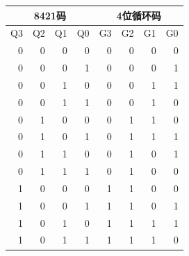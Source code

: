 \documentclass[11pt,UTF8]{ctexart}
\def\toprule{\hline}
\def\midrule{\hline}
\begin{document}
\begin{table}[htbp]
  \centering
    \begin{tabular}{|r|r|r|r|r|r|r|r|}
    \toprule
    \multicolumn{4}{|c|}{8421码}   & \multicolumn{4}{c|}{4位循环码} \\
    \midrule
    \multicolumn{1}{|p{4.19em}|}{Q3 } & \multicolumn{1}{p{4.19em}|}{Q2 } & \multicolumn{1}{p{4.19em}|}{Q1 } & \multicolumn{1}{p{4.19em}|}{Q0 } & \multicolumn{1}{p{4.19em}|}{G3 } & \multicolumn{1}{p{4.19em}|}{G2 } & \multicolumn{1}{p{4.19em}|}{G1 } & \multicolumn{1}{p{4.19em}|}{G0} \\
    \midrule
    0     & 0     & 0     & 0     & 0     & 0     & 0     & 0 \\
    \midrule
    0     & 0     & 0     & 1     & 0     & 0     & 0     & \textcolor[rgb]{ 1,  0,  0}{1} \\
    \midrule
    0     & 0     & 1     & 0     & 0     & 0     & \textcolor[rgb]{ 1,  0,  0}{1} & \textcolor[rgb]{ 1,  0,  0}{1} \\
    \midrule
    0     & 0     & 1     & 1     & 0     & 0     & \textcolor[rgb]{ 1,  0,  0}{1} & 0 \\
    \midrule
    0     & 1     & 0     & 0     & 0     & \textcolor[rgb]{ 1,  0,  0}{1} & \textcolor[rgb]{ 1,  0,  0}{1} & 0 \\
    \midrule
    0     & 1     & 0     & 1     & 0     & \textcolor[rgb]{ 1,  0,  0}{1} & \textcolor[rgb]{ 1,  0,  0}{1} & \textcolor[rgb]{ 1,  0,  0}{1} \\
    \midrule
    0     & 1     & 1     & 0     & 0     & \textcolor[rgb]{ 1,  0,  0}{1} & 0     & \textcolor[rgb]{ 1,  0,  0}{1} \\
    \midrule
    0     & 1     & 1     & 1     & 0     & \textcolor[rgb]{ 1,  0,  0}{1} & 0     & 0 \\
    \midrule
    1     & 0     & 0     & 0     & \textcolor[rgb]{ 1,  0,  0}{1} & \textcolor[rgb]{ 1,  0,  0}{1} & 0     & 0 \\
    \midrule
    1     & 0     & 0     & 1     & \textcolor[rgb]{ 1,  0,  0}{1} & \textcolor[rgb]{ 1,  0,  0}{1} & 0     & \textcolor[rgb]{ 1,  0,  0}{1} \\
    \midrule
    1     & 0     & 1     & 0     & \textcolor[rgb]{ 1,  0,  0}{1} & \textcolor[rgb]{ 1,  0,  0}{1} & \textcolor[rgb]{ 1,  0,  0}{1} & \textcolor[rgb]{ 1,  0,  0}{1} \\
    \midrule
    1     & 0     & 1     & 1     & \textcolor[rgb]{ 1,  0,  0}{1} & \textcolor[rgb]{ 1,  0,  0}{1} & \textcolor[rgb]{ 1,  0,  0}{1} & 0 \\

\end{tabular}
\end{table}
\end{document}
